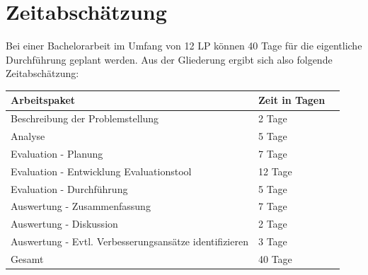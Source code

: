 \section{Zeitabschätzung}
Bei einer Bachelorarbeit im Umfang von 12 LP können 40 Tage für die eigentliche Durchführung geplant werden. Aus der Gliederung ergibt sich also folgende Zeitabschätzung:
\begin{table}[h]
    \centering
    \begin{tabular}{|l|l|l|}
    	\hline
        Arbeitspaket & Zeit in Tagen \\
        \hline
        Beschreibung der Problemstellung & 2 Tage \\
        Analyse & 5 Tage \\
        Evaluation - Planung & 7 Tage \\
        Evaluation - Entwicklung Evaluationstool & 12 Tage \\
        Evaluation - Durchführung & 5 Tage \\
        Auswertung - Zusammenfassung & 7 Tage \\
        Auswertung - Diskussion & 2 Tage \\
        Auswertung - Evtl. Verbesserungsansätze identifizieren & 3 Tage \\
        \hline
        Gesamt & 40 Tage \\
        \hline
        
    \end{tabular}
\end{table}
